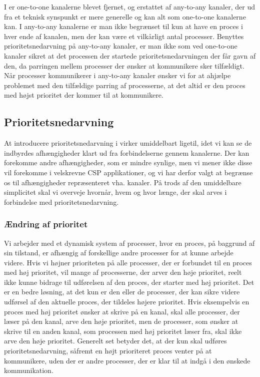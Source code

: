 I \pycsp er one-to-one kanalerne blevet fjernet, og erstattet af any-to-any kanaler, der ud fra et teknisk synspunkt er mere generelle og kan alt som one-to-one kanalerne kan. I any-to-any kanalerne er man ikke begrænset til kun at have en proces i hver ende af kanalen, men der kan være et vilkårligt antal processer. 
Benyttes prioritetsnedarvning på any-to-any kanaler, er man ikke som ved one-to-one kanaler sikret at det  processen der startede  prioritetsnedarvningen der får gavn af den, da parringen mellem processer der ønsker at kommunikere sker tilfældigt. Når processer kommunikerer i  any-to-any kanaler ønsker vi for at ahjælpe problemet med den tilfældige parring af processerne, at det altid er den proces med højst prioritet der kommer til at kommunikere.


\subsection{Prioritetsnedarvning}\label{sec:rtp-pycsp-nedarvning}
At introducere prioritetsnedarvning i \pycsp virker umiddelbart ligetil, idet vi kan se de indbyrdes afhængigheder klart ud fra forbindelserne gennem kanalerne. Der kan forekomme andre afhængigheder, som er mindre synlige, men vi mener ikke disse vil forekomme i velskrevne CSP applikationer, og vi har derfor valgt at begrænse os til afhængigheder repræsenteret vha. kanaler. På trods af den umiddelbare simplicitet skal vi overveje hvornår, hvem og hvor længe, der skal arves i forbindelse med prioritetsnedarvning.

\subsubsection{Ændring af prioritet}
\label{sec:aendring-af-prioritet}
Vi arbejder med et dynamisk system af processer, hvor en proces, på baggrund af sin tilstand, er afhængig af forskellige andre processer for at kunne arbejde videre. 
Hvis vi højner prioriteten på alle processer, der er forbundet til en proces med høj prioritet, vil mange af processerne, der arver den høje prioritet, reelt ikke kunne bidrage til udførelsen af den proces, der starter med høj prioritet. Det er en bedre løsning, at det kun er den eller de processer, der kan sikre videre udførsel af den aktuelle proces, der tildeles højere prioritet. Hvis eksempelvis en proces med høj prioritet ønsker at skrive på en kanal, skal alle processer, der læser på den kanal, arve den høje prioritet, men de processer, som ønsker at skrive til en anden kanal, som processen med høj prioritet læser fra, skal ikke arve den høje prioritet. Generelt set betyder det, at der kun skal udføres prioritetsnedarvning, såfremt en højt prioriteret proces venter på at kommunikere, uden der er andre processer, der er klar til at indgå i den ønskede kommunikation. 

